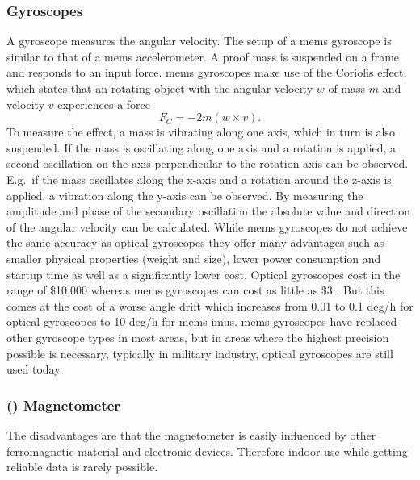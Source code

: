 \subsubsection{ Gyroscopes}
A gyroscope measures the angular velocity.
The setup of a \acrshort{mems} gyroscope is similar to that of a \acrshort{mems} accelerometer.
A proof mass is suspended on a frame and responds to an input force.
\acrshort{mems} gyroscopes make use of the Coriolis effect, which states that an rotating object with the angular velocity $w$ of mass $m$ and velocity $v$ experiences a force
\[ F_C = -2m(w\times v). \]
To measure the effect, a mass is vibrating along one axis, which in turn is also suspended.
If the mass is oscillating along one axis and a rotation is applied, a second oscillation on the axis perpendicular to the rotation axis can be observed.
E.g.\ if the mass oscillates along the x-axis and a rotation around the z-axis is applied, a vibration along the y-axis can be observed.
By measuring the amplitude and phase of the secondary oscillation the absolute value and direction of the angular velocity can be calculated.
While \acrshort{mems} gyroscopes do not achieve the same accuracy as optical gyroscopes they offer many advantages such as smaller physical properties (weight and size), lower power consumption and startup time as well as a significantly lower cost.
Optical gyroscopes cost in the range of \$10,000 whereas \acrshort{mems} gyroscopes can cost as little as \$3 \cite{Perlmutter2016}.
But this comes at the cost of a worse angle drift which increases from 0.01 to 0.1 deg/h for optical gyroscopes to 10 deg/h  for \acrshort{mems}-\acrshort{imu}s.
\acrshort{mems} gyroscopes have replaced other gyroscope types in most areas, but in areas where the highest precision possible is necessary, typically in military industry, optical gyroscopes are still used today.

\subsubsection{() Magnetometer}
The disadvantages are that the magnetometer is easily influenced by other ferromagnetic material and electronic devices.
Therefore indoor use while getting reliable data is rarely possible.

